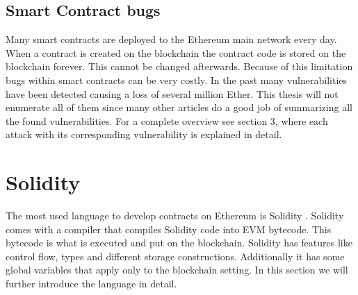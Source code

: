 \documentclass[a4paper]{article}
\begin{document}
\subsection{Smart Contract bugs}
Many smart contracts are deployed to the Ethereum main network every day. When a contract is created on the blockchain the contract code is stored on the blockchain forever. This cannot be changed afterwards. Because of this limitation bugs within smart contracts can be very costly. In the past many vulnerabilities have been detected causing a loss of several million Ether. This thesis will not enumerate all of them since many other articles do a good job of summarizing all the found vulnerabilities. For a complete overview see \cite{dika2017ethereum} section 3, where each attack with its corresponding vulnerability is explained in detail.

\newpage
\section{Solidity}
\label{sec:solidity}
The most used language to develop contracts on Ethereum is Solidity \cite{solidityreadthedocs}. Solidity comes with a compiler that compiles Solidity code into EVM bytecode. This bytecode is what is executed and put on the blockchain. Solidity has features like control flow, types and different storage constructions. Additionally it has some global variables that apply only to the blockchain setting. In this section we will further introduce the language in detail.
\end{document}
